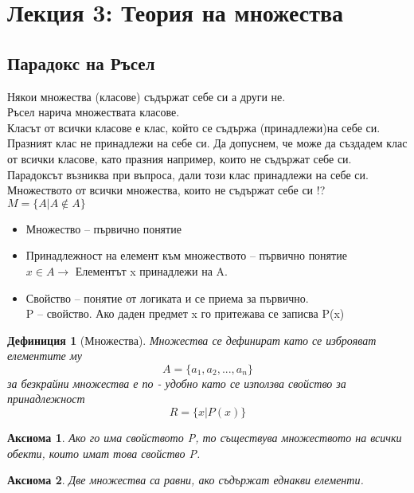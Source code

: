 \documentclass[fleqn, 12pt]{article}
\newtheorem{definition}{Дефиниция}[subsection]
\newtheorem{axiom}{Аксиома}[subsection]
\theoremstyle{definition}
\begin{document}
\newpage

\section{Лекция 3: Теория на множества}

\subsection{Парадокс на Ръсел}
Някои множества (класове) съдържат себе си а други не.\\
Ръсел нарича множествата класове.\\
Класът от всички класове е клас, който се съдържа (принадлежи)на себе си. Празният клас не принадлежи на себе си. Да допуснем, че може да създадем клас от всички класове, като празния например, които не съдържат себе си.\\
Парадоксът възниква при въпроса, дали този клас принадлежи на себе си. \\
Множеството от всички множества, които не съдържат себе си !? \\
$M = \{ A | A \notin A \}$\\
\begin{itemize}
	\item Множество – първично понятие
	\item Принадлежност на елемент към множеството – първично понятие \\
$x\in A \to$ Елементът x принадлежи на A.
	\item Свойство – понятие от логиката и се приема за първично. \\
P – свойство. Ако даден предмет x го притежава се записва P(x)
\end{itemize}

\begin{definition}[Множества]
Множества се дефинират като се изброяват елементите му 
$$A = \{ a_1, a_2, ..., a_n\}$$
за безкрайни множества е по - удобно като се използва свойство за принадлежност 
$$R = \{x | P(x) \} $$
\end{definition}

\begin{axiom}
Ако го има свойството P, то съществува множеството на всички обекти, които имат това свойство P.
\end{axiom}

\begin{axiom}
Две множества са равни, ако съдържат еднакви елементи.
\end{axiom}
\end{document}
